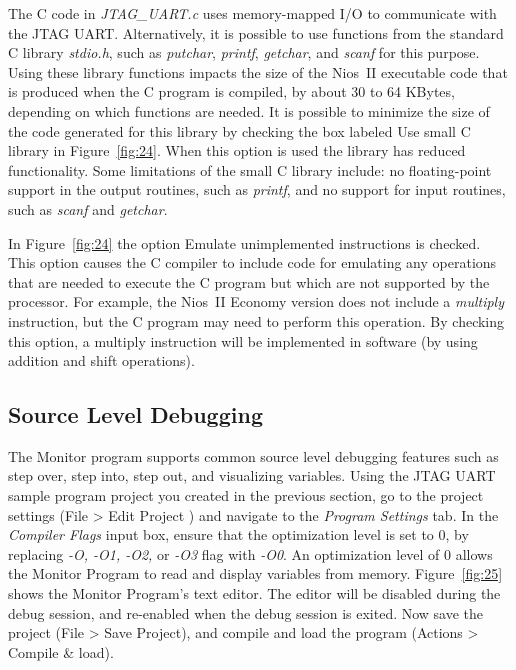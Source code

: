 \documentclass[11pt, twoside, pdftex]{article}
\begin{document}
The C code in {\it JTAG\_UART.c} uses memory-mapped I/O to
communicate with the JTAG UART. Alternatively, it is possible to
use functions from the standard C library {\it stdio.h}, such as
{\it putchar}, {\it printf}, {\it getchar}, and {\it scanf} for
this purpose.  Using these library functions impacts the size of
the Nios~II executable code that is produced when the C program
is compiled, by about 30 to 64 KBytes, depending on
which functions are needed.  It is possible to minimize the size
of the code generated for this library by checking the box labeled {\sf Use small C library} in 
Figure~\ref{fig:24}. When this option is used the
library has reduced functionality. 
Some limitations of the small C library include: 
no floating-point support in the output routines, 
such as {\it printf}, and no support for input routines, 
such as {\it scanf} and {\it getchar}.

In Figure~\ref{fig:24} the option {\sf Emulate unimplemented instructions}
is checked. This option causes the C compiler to include code for
emulating any operations that are needed to execute the C program
but which are not supported by the processor. For example, the
Nios~II Economy version does not include a {\it multiply}
instruction, but the C program may need to perform this
operation. By checking this option, a multiply instruction 
will be implemented in software (by using addition and shift
operations).
\newpage 

\subsection{Source Level Debugging}
The Monitor program supports common source level debugging features such as step over, step into, 
step out, and visualizing variables. Using the JTAG UART sample program project you created in the previous section, 
go to the project settings ({\sf File > Edit Project }) and navigate to the {\it Program Settings} tab. 
In the {\it Compiler Flags} input box, ensure that the optimization level is set to 0, by replacing {\it -O, -O1, -O2, } 
or {\it -O3} flag with {\it -O0}. An optimization level of 0 allows the Monitor Program to read and display 
variables from memory. Figure~\ref{fig:25} shows the Monitor Program's text editor. The editor will be disabled
during the debug session, and re-enabled when the debug session is exited. Now save the project ({\sf File > Save Project}), 
and compile and load the program ({\sf Actions > Compile \& load}).
\end{document}
